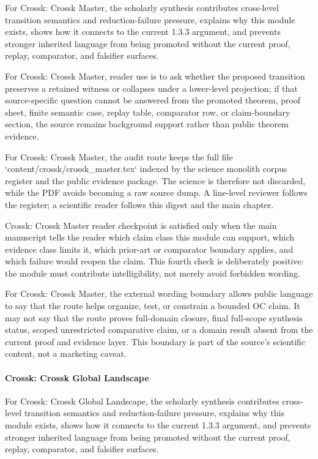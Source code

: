 For Crossk: Crossk Master, the scholarly synthesis contributes cross-level transition semantics and reduction-failure pressure, explains why this module exists, shows how it connects to the current 1.3.3 argument, and prevents stronger inherited language from being promoted without the current proof, replay, comparator, and falsifier surfaces.


For Crossk: Crossk Master, reader use is to ask whether the proposed transition preserves a retained witness or collapses under a lower-level projection; if that source-specific question cannot be answered from the promoted theorem, proof sheet, finite semantic case, replay table, comparator row, or claim-boundary section, the source remains background support rather than public theorem evidence.


For Crossk: Crossk Master, the audit route keeps the full file `content/crossk/crossk\_master.tex` indexed by the science monolith corpus register and the public evidence package. The science is therefore not discarded, while the PDF avoids becoming a raw source dump. A line-level reviewer follows the register; a scientific reader follows this digest and the main chapter.


Crossk: Crossk Master reader checkpoint is satisfied only when the main manuscript tells the reader which claim class this module can support, which evidence class limits it, which prior-art or comparator boundary applies, and which failure would reopen the claim. This fourth check is deliberately positive: the module must contribute intelligibility, not merely avoid forbidden wording.


For Crossk: Crossk Master, the external wording boundary allows public language to say that the route helps organize, test, or constrain a bounded OC claim. It may not say that the route proves full-domain closure, final full-scope synthesis status, scoped unrestricted comparative claim, or a domain result absent from the current proof and evidence layer. This boundary is part of the source's scientific content, not a marketing caveat.


\paragraph{Crossk: Crossk Global Landscape}

For Crossk: Crossk Global Landscape, the scholarly synthesis contributes cross-level transition semantics and reduction-failure pressure, explains why this module exists, shows how it connects to the current 1.3.3 argument, and prevents stronger inherited language from being promoted without the current proof, replay, comparator, and falsifier surfaces.


